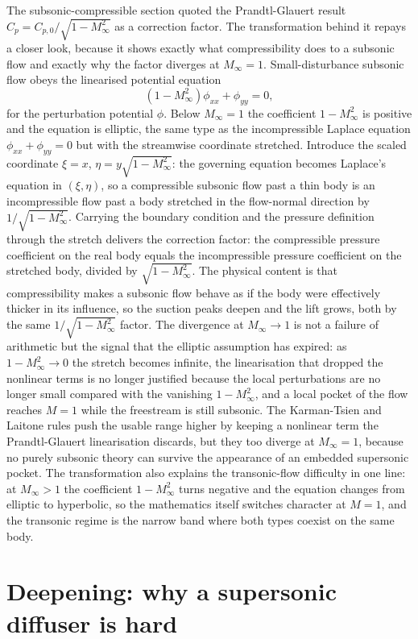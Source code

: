 The subsonic-compressible section quoted the Prandtl-Glauert result
$C_p = C_{p,0}/\sqrt{1 - M_\infty^2}$ as a correction factor. The
transformation behind it repays a closer look, because it shows exactly
what compressibility does to a subsonic flow and exactly why the factor
diverges at $M_\infty = 1$. Small-disturbance subsonic flow obeys the
linearised potential equation
\[
(1 - M_\infty^2)\phi_{xx} + \phi_{yy} = 0,
\]
for the perturbation potential $\phi$. Below $M_\infty = 1$ the
coefficient $1 - M_\infty^2$ is positive and the equation is elliptic,
the same type as the incompressible Laplace equation $\phi_{xx} +
\phi_{yy} = 0$ but with the streamwise coordinate stretched. Introduce
the scaled coordinate $\xi = x$, $\eta = y\sqrt{1 - M_\infty^2}$: the
governing equation becomes Laplace's equation in $(\xi, \eta)$, so a
compressible subsonic flow past a thin body is an incompressible flow
past a body stretched in the flow-normal direction by
$1/\sqrt{1 - M_\infty^2}$. Carrying the boundary condition and the
pressure definition through the stretch delivers the correction factor:
the compressible pressure coefficient on the real body equals the
incompressible pressure coefficient on the stretched body, divided by
$\sqrt{1 - M_\infty^2}$. The physical content is that compressibility
makes a subsonic flow behave as if the body were effectively thicker in
its influence, so the suction peaks deepen and the lift grows, both by
the same $1/\sqrt{1 - M_\infty^2}$ factor. The divergence at
$M_\infty \to 1$ is not a failure of arithmetic but the signal that the
elliptic assumption has expired: as $1 - M_\infty^2 \to 0$ the stretch
becomes infinite, the linearisation that dropped the nonlinear terms is
no longer justified because the local perturbations are no longer small
compared with the vanishing $1 - M_\infty^2$, and a local pocket of the
flow reaches $M = 1$ while the freestream is still subsonic. The
Karman-Tsien and Laitone rules push the usable range higher by keeping a
nonlinear term the Prandtl-Glauert linearisation discards, but they too
diverge at $M_\infty = 1$, because no purely subsonic theory can survive
the appearance of an embedded supersonic pocket. The transformation
also explains the transonic-flow difficulty in one line: at
$M_\infty > 1$ the coefficient $1 - M_\infty^2$ turns negative and the
equation changes from elliptic to hyperbolic, so the mathematics itself
switches character at $M = 1$, and the transonic regime is the narrow
band where both types coexist on the same body.

\section{Deepening: why a supersonic diffuser is hard}

